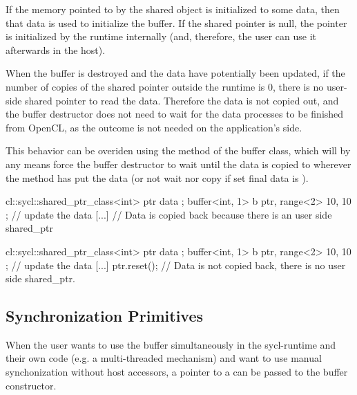 If the memory pointed to by the shared object is initialized to some data, then
that data is used to initialize the buffer.
If the shared pointer is null, the pointer is initialized by the runtime
internally (and, therefore, the user can use it afterwards in the host).

When the buffer is destroyed and the data have potentially been updated, if the number of copies of the shared pointer
outside the runtime is 0, there is no user-side shared pointer to read the data.
 Therefore the data is not copied out, and the buffer destructor does not need
to wait for the data processes to be finished from OpenCL, as the outcome is not needed
on the application's side.

This behavior can be overiden using the  method of
the buffer class, which will by any means force the buffer destructor to
wait until the data is copied to wherever the  method has
put the data (or not wait nor copy if set final data is
).

\begin{code}
{
  cl::sycl::shared_ptr_class<int> ptr { data };
  {
    buffer<int, 1> b { ptr, range<2>{ 10, 10 } };
    // update the data
    [...]
  } // Data is copied back because there is an user side shared_ptr
}
\end{code}

\begin{code}
{
  cl::sycl::shared_ptr_class<int> ptr { data };
  {
    buffer<int, 1> b { ptr, range<2>{ 10, 10 } };
    // update the data
    [...]
    ptr.reset();
  } // Data is not copied back, there is no user side shared_ptr.
}
\end{code}



\subsection{Synchronization Primitives}
\label{Mutex}

When the user wants to use the buffer simultaneously in the \gls{sycl-runtime}
and their own code (e.g. a multi-threaded mechanism) and want to use manual
synchonization without host \glspl{accessor}, a pointer to a  can be
passed to the buffer constructor.

